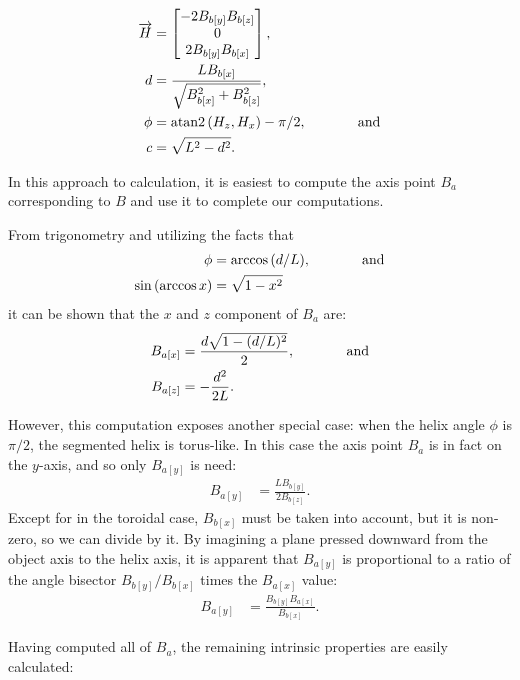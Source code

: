 \documentclass[mathematics,article,submit,pdftex,moreauthors]{Definitions/mdpi}
\DeclareMathOperator{\atantwo}{atan2}
\begin{document}
\begin{align}
  \overrightarrow{H} &=  \begin{bmatrix} -2 B_{b[y]} B_{b[z]} \\ 0 \\ 2 B_{b[y]} B_{b[x]}  \end{bmatrix}, \\
  d &= \frac{L B_{b[x]}}{\sqrt{B_{b[x]}^2 + B_{b[z]}^2}},  \\
  \phi &= \atantwo{(H_z,H_x)} - \pi/2, \text{ \hspace{3em} and} \\
  c &= \sqrt{L^2 - d^2}.
\end{align}

In this approach to calculation, it is easiest
to compute the axis point $B_a$ corresponding to $B$ and
use it to complete our computations.

From trigonometry and utilizing the facts that
\begin{align}
\phi &= \arccos{(d/L)}, \text{ \hspace{3em} and} \\
\sin{(\arccos{x})} &= \sqrt{1 - x^2}
\end{align}
  it
can be shown that
the $x$ and $z$ component of $B_a$ are:
\begin{align}
  B_{a[x]} &= \frac{d\sqrt{1 - (d/L)^2}}{2}, \text{ \hspace{3em} and}\\
  B_{a[z]} &= -\frac{d^2}{2L}.
\end{align}

However, this computation exposes another special case: when the
helix angle $\phi$ is $\pi /2$, the segmented helix is
torus-like. In this case the axis point $B_a$ is in fact
on the $y$-axis, and so only $B_{a[y]}$ is need:
\begin{align}
  B_{a[y]} &=  \frac{L B_{b[y]}}{2 B_{b[z]}}.
\end{align}
Except for in the toroidal case,  $B_{b[x]}$ must be taken into
account, but it is non-zero, so we can divide by it.
By imagining a plane pressed downward from the
object axis to the helix axis, it is apparent that $B_{a[y]}$
is proportional to a ratio of the angle bisector
$B_{b[y]}/B_{b[x]}$ times the $B_{a[x]}$ value:
\begin{align}
  B_{a[y]} &=  \frac{ B_{b[y]} B_{a[x]}}{ B_{b[x]}}.
\end{align}

Having computed all of $B_a$, the remaining intrinsic properties are easily
calculated:
\end{document}
